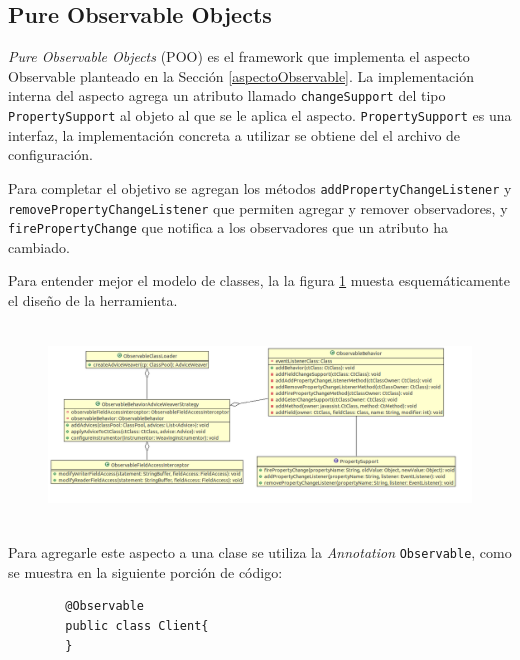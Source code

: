 \subsection{Pure Observable Objects}
	\label{poo}
	\emph{Pure Observable Objects} (POO) es el framework que implementa el
	aspecto Observable planteado en la Sección \ref{aspectoObservable}.
	La implementación interna del aspecto agrega un
	atributo llamado \lstinline|changeSupport| del tipo
	\lstinline|PropertySupport| al objeto al que se le aplica el aspecto.
	\lstinline|PropertySupport| es una interfaz, la implementación concreta a
	utilizar se obtiene del el archivo de configuración.
	
	Para completar el objetivo se agregan los métodos 
	\lstinline|addPropertyChangeListener| y
	\lstinline|removePropertyChangeListener| que permiten agregar 
	y remover observadores, y \lstinline|firePropertyChange|
	que notifica a los observadores que un atributo ha cambiado.
	
	Para entender mejor el modelo de classes, la la figura \ref{fig:poo} muesta
	esquemáticamente el diseño de la herramienta.
	
	\begin{figure}
		\includegraphics[width=450px, height=200px]{img/poo}
	 	\label{fig:poo}
	 	\caption{}
	\end{figure}
	
	Para agregarle este aspecto a una clase se utiliza la \emph{Annotation}
	 \lstinline|Observable|, como
	se muestra en la siguiente porción de código:
	\begin{lstlisting} 
		@Observable
		public class Client{
		}
	\end{lstlisting}
